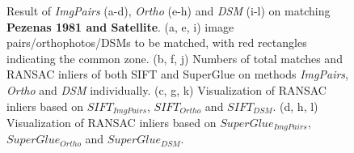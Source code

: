 \begin{figure}[htbp]
\begin{center}
{\begin{minipage}[t]{0.48\linewidth}
			\end{minipage}%
		}
		\caption{{\scriptsize Result of \textit{ImgPairs} (a-d), \textit{Ortho} (e-h) and \textit{DSM} (i-l) on matching \textbf{Pezenas 1981 and Satellite}. (a, e, i) image pairs/orthophotos/DSMs to be matched, with red rectangles indicating the common zone. (b, f, j) Numbers of total matches and RANSAC inliers of both SIFT and SuperGlue on methods \textit{ImgPairs}, \textit{Ortho} and \textit{DSM} individually. (c, g, k) Visualization of RANSAC inliers based on $SIFT_{ImgPairs}$, $SIFT_{Ortho}$ and $SIFT_{DSM}$. (d, h, l) Visualization of RANSAC inliers based on $SuperGlue_{ImgPairs}$, $SuperGlue_{Ortho}$ and $SuperGlue_{DSM}$.}}        
		\label{MatchVizPezenas-Satellite1981DSM}
	\end{center}
\end{figure} 



